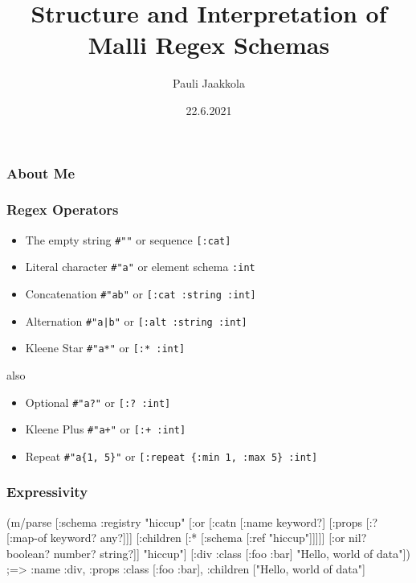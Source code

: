 \documentclass{beamer}
\title{Structure and Interpretation of Malli Regex Schemas}
\author{Pauli Jaakkola}
\date{22.6.2021}
\begin{document}
\frame{\titlepage}


\begin{frame}
\frametitle{About Me}
\end{frame}


\begin{frame}
\frametitle{Regex Operators}

\begin{itemize}
\item The empty string \texttt{\#""} or sequence \texttt{[:cat]}
\item Literal character \texttt{\#"a"} or element schema \texttt{:int}
\item Concatenation \texttt{\#"ab"} or \texttt{[:cat :string :int]}
\item Alternation \texttt{\#"a|b"} or \texttt{[:alt :string :int]}
\item Kleene Star \texttt{\#"a*"} or \texttt{[:* :int]}
\end{itemize}

also

\begin{itemize}
\item Optional \texttt{\#"a?"} or \texttt{[:? :int]}
\item Kleene Plus \texttt{\#"a+"} or \texttt{[:+ :int]}
\item Repeat \texttt{\#"a\{1, 5\}"} or \texttt{[:repeat \{:min 1, :max 5\} :int]}
\end{itemize}

\end{frame}


\begin{frame}[fragile]
\frametitle{Expressivity}

{\scriptsize
\begin{semiverbatim}
(m/parse
  [:schema {:registry {"hiccup" [:or
                                 [:catn
                                  [:name keyword?]
                                  [:props [:? [:map-of keyword? any?]]]
                                  [:children [:* [:schema [:ref "hiccup"]]]]]
                                 [:or nil? boolean? number? string?]]}}
   "hiccup"]
  [:div {:class [:foo :bar]}
   "Hello, world of data"])
;=> {:name :div, :props {:class [:foo :bar]}, :children ["Hello, world of data"]}
\end{semiverbatim}
}

\end{frame}
\end{document}
